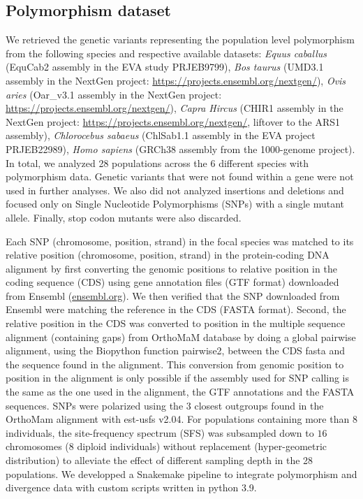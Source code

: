 \documentclass{article}
\begin{document}
    \subsection{Polymorphism dataset}
    \label{subsec:polymorphism-dataset}

    We retrieved the genetic variants representing the population level polymorphism from the following species and respective available datasets: \textit{Equus caballus} (EquCab2 assembly in the EVA study PRJEB9799\cite{alabri_whole_2020}), \textit{Bos taurus} (UMD3.1 assembly in the NextGen project: \url{https://projects.ensembl.org/nextgen/}), \textit{Ovis aries} (Oar\_v3.1 assembly in the NextGen project: \url{https://projects.ensembl.org/nextgen/}), \textit{Capra Hircus} (CHIR1 assembly in the NextGen project: \url{https://projects.ensembl.org/nextgen/}, liftover to the ARS1 assembly), \textit{Chlorocebus sabaeus} (ChlSab1.1 assembly in the EVA project PRJEB22989\cite{svardal_ancient_2017}), \textit{Homo sapiens} (GRCh38 assembly from the 1000-genome project\cite{consortium_integrated_2012a, the1000genomesprojectconsortium_global_2015}).
    In total, we analyzed 28 populations across the 6 different species with polymorphism data.
    Genetic variants that were not found within a gene were not used in further analyses.
    We also did not analyzed insertions and deletions and focused only on Single Nucleotide Polymorphisms (SNPs) with a single mutant allele.
    Finally, stop codon mutants were also discarded.

    Each SNP (chromosome, position, strand) in the focal species was matched to its relative position (chromosome, position, strand) in the protein-coding DNA alignment by first converting the genomic positions to relative position in the coding sequence (CDS) using gene annotation files (GTF format) downloaded from Ensembl (\url{ensembl.org}).
    We then verified that the SNP downloaded from Ensembl were matching the reference in the CDS (FASTA format).
    Second, the relative position in the CDS was converted to position in the multiple sequence alignment (containing gaps) from OrthoMaM database\cite{ranwez_orthomam_2007, douzery_orthomam_2014, scornavacca_orthomam_2019} by doing a global pairwise alignment, using the Biopython function pairwise2, between the CDS fasta and the sequence found in the alignment.
    This conversion from genomic position to position in the alignment is only possible if the assembly used for SNP calling is the same as the one used in the alignment, the GTF annotations and the FASTA sequences.
    SNPs were polarized using the $3$ closest outgroups found in the OrthoMam alignment with est-usfs v2.04\cite{keightley_inferring_2018}.
    For populations containing more than $8$ individuals, the site-frequency spectrum (SFS) was subsampled down to $16$ chromosomes ($8$ diploid individuals) without replacement (hyper-geometric distribution) to alleviate the effect of different sampling depth in the 28 populations.
    We developped a Snakemake pipeline to integrate polymorphism and divergence data with custom scripts written in python 3.9.
\end{document}
